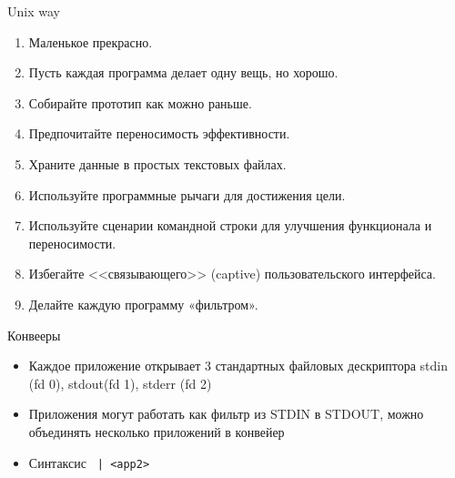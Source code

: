 \documentclass[ignorenonframetext, professionalfonts, hyperref={unicode}]{beamer}
\begin{document}
\begin{frame}{Unix way}
  \begin{enumerate}
    \item   Маленькое прекрасно.
    \item   Пусть каждая программа делает одну вещь, но хорошо.
    \item   Собирайте прототип как можно раньше.
    \item   Предпочитайте переносимость эффективности.
    \item   Храните данные в простых текстовых файлах.
    \item   Используйте программные рычаги для достижения цели.
    \item   Используйте сценарии командной строки для улучшения функционала и переносимости.
    \item   Избегайте <<связывающего>> (captive) пользовательского интерфейса.
    \item   Делайте каждую программу «фильтром».
  \end{enumerate}
\end{frame}

\begin{frame}{Конвееры}
  \begin{itemize}
    \item <1-> Каждое приложение открывает 3 стандартных файловых дескриптора stdin (fd 0), stdout(fd 1), stderr (fd 2)
    \item <2-> Приложения могут работать как фильтр из STDIN в STDOUT, можно объединять несколько приложений в конвейер
    \item <2-> Синтаксис {\tt <app1> | <app2>}
  \end{itemize}
\end{frame}
\end{document}
